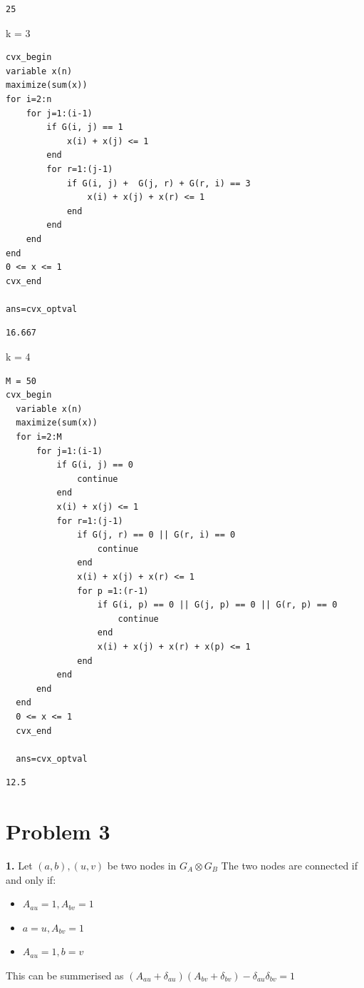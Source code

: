 \documentclass[11pt]{article}
\begin{document}
\begin{verbatim}
25
\end{verbatim}


k = 3

\begin{verbatim}
cvx_begin 
variable x(n)
maximize(sum(x))
for i=2:n
    for j=1:(i-1)
        if G(i, j) == 1
            x(i) + x(j) <= 1
        end
        for r=1:(j-1)
            if G(i, j) +  G(j, r) + G(r, i) == 3
                x(i) + x(j) + x(r) <= 1
            end
        end
    end
end
0 <= x <= 1
cvx_end

ans=cvx_optval
\end{verbatim}

\begin{verbatim}
16.667
\end{verbatim}

k = 4
\begin{verbatim}
M = 50
cvx_begin 
  variable x(n)
  maximize(sum(x))
  for i=2:M
      for j=1:(i-1)
          if G(i, j) == 0
              continue
          end
          x(i) + x(j) <= 1
          for r=1:(j-1)
              if G(j, r) == 0 || G(r, i) == 0
                  continue
              end
              x(i) + x(j) + x(r) <= 1
              for p =1:(r-1)
                  if G(i, p) == 0 || G(j, p) == 0 || G(r, p) == 0
                      continue
                  end
                  x(i) + x(j) + x(r) + x(p) <= 1
              end
          end
      end
  end
  0 <= x <= 1
  cvx_end

  ans=cvx_optval
\end{verbatim}

\begin{verbatim}
12.5
\end{verbatim}




\section{Problem 3}
\label{sec:orgheadline5}
\textbf{1.}
Let \((a, b), (u, v)\) be two nodes in \(G_A \otimes G_B\)
The two nodes are connected if and only if:
\begin{itemize}
\item \(A_{au} = 1, A_{bv} = 1\)
\item \(a = u, A_{bv} = 1\)
\item \(A_{au} = 1, b = v\)
\end{itemize}
This can be summerised as \((A_{au} + \delta_{au})(A_{bv} + \delta_{bv}) - \delta_{au}\delta_{bv} = 1\)
\end{document}
